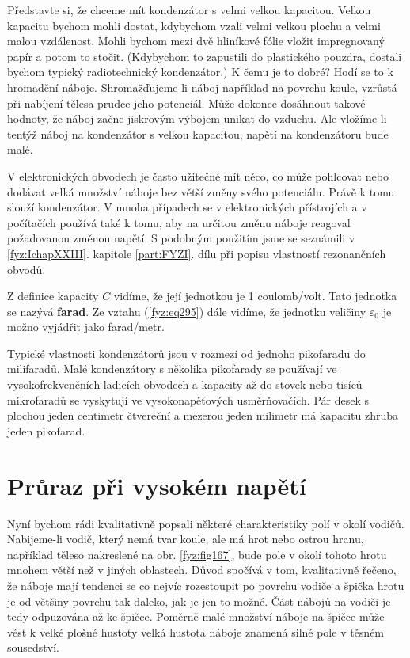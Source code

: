   Představte si, že chceme mít kondenzátor s velmi velkou kapacitou. Velkou kapacitu bychom mohli
  dostat, kdybychom vzali velmi velkou plochu a velmi malou vzdálenost. Mohli bychom mezi dvě
  hliníkové fólie vložit impregnovaný papír a potom to stočit. (Kdybychom to zapustili do
  plastického pouzdra, dostali bychom typický radiotechnický kondenzátor.) K čemu je to dobré? Hodí
  se to k hromadění náboje. Shromažďujeme-li náboj například na povrchu koule, vzrůstá při nabíjení
  tělesa prudce jeho potenciál. Může dokonce dosáhnout takové hodnoty, že náboj začne jiskrovým
  výbojem unikat do vzduchu. Ale vložíme-li tentýž náboj na kondenzátor s velkou kapacitou, napětí
  na kondenzátoru bude malé.

  V elektronických obvodech je často užitečné mít něco, co může pohlcovat nebo dodávat velká
  množství náboje bez větší změny svého potenciálu. Právě k tomu slouží kondenzátor. V mnoha
  případech se v elektronických přístrojích a v počítačích používá také k tomu, aby na určitou změnu
  náboje reagoval požadovanou změnou napětí. S podobným použitím jsme se seznámili v
  \ref{fyz:IchapXXIII}. kapitole \ref{part:FYZI}. dílu při popisu vlastností rezonančních obvodů.

  Z definice kapacity \(C\) vidíme, že její jednotkou je 1 coulomb/volt. Tato jednotka se nazývá
  \textbf{farad}. Ze vztahu (\ref{fyz:eq295}) dále vidíme, že jednotku veličiny \(\varepsilon_0\) je
  možno vyjádřit jako farad/metr.

  Typické vlastnosti kondenzátorů jsou v rozmezí od jednoho pikofaradu do milifaradů. Malé
  kondenzátory s několika pikofarady se používají ve vysokofrekvenčních ladicích obvodech a kapacity
  až do stovek nebo tisíců mikrofaradů se vyskytují ve vysokonapěťových usměrňovačích. Pár desek s
  plochou jeden centimetr čtvereční a mezerou jeden milimetr má kapacitu zhruba jeden pikofarad.
  
\section{Průraz při vysokém napětí}\label{fyz:IIchapVsecXX}
  Nyní bychom rádi kvalitativně popsali některé charakteristiky polí v okolí vodičů. Nabijeme-li
  vodič, který nemá tvar koule, ale má hrot nebo ostrou hranu, například těleso nakreslené na obr.
  \ref{fyz:fig167}, bude pole v okolí tohoto hrotu mnohem větší než v jiných oblastech. Důvod
  spočívá v tom, kvalitativně řečeno, že náboje mají tendenci se co nejvíc rozestoupit po povrchu
  vodiče a špička hrotu je od většiny povrchu tak daleko, jak je jen to možné. Část nábojů na vodiči
  je tedy odpuzována až ke špičce. Poměrně malé množství náboje na špičce může vést k velké plošné
  hustoty velká hustota náboje znamená silné pole v těsném sousedství.

